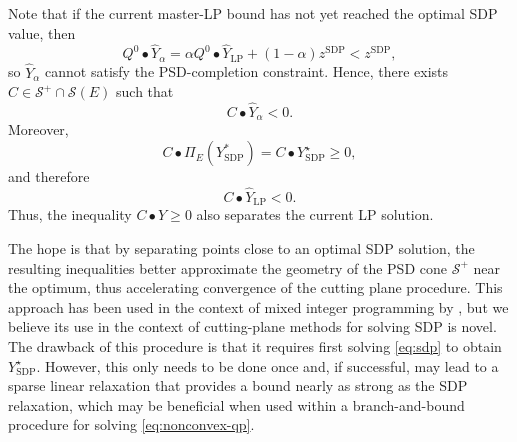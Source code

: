 \documentclass[twoside]{article}
\newcommand{\oo}[1]{{\textcolor{blue}{#1}}}
\newcommand{\ooc}[1]{{ \oo{[OG comment: #1}]}}
\newcommand{\matip}[2]{#1 \bullet #2}
\newcommand{\citet}[1]{\cite{#1}}
\begin{document}
		
		
		Note that if the current master-LP bound has not yet reached the optimal SDP value, then 
		\[ Q^0 \bullet \widehat Y_\alpha = \alpha Q^0\bullet\widehat Y_{\mathrm{LP}} + (1-\alpha)z^{\mathrm{SDP}} < z^{\mathrm{SDP}}, \]
		so $\widehat Y_\alpha$ cannot satisfy the PSD-completion constraint. Hence, there exists $C\in\mathcal S^+\cap\mathcal S(E)$ such that
		\[ C \bullet \widehat Y_\alpha < 0. \]
		Moreover,
		\[ C \bullet \Pi_E(Y^*_{\mathrm{SDP}}) = C \bullet Y_{\mathrm{SDP}}^\star \geq 0, \]
		and therefore
		\[ C \bullet \widehat Y_{\mathrm{LP}} < 0. \]
		Thus, the inequality $C\bullet Y\geq0$ also separates the current LP solution.
		
		
		
		The hope is that by separating points close to an optimal SDP solution, the resulting inequalities better approximate the geometry of the PSD cone $\mathcal{S}^+$ near the optimum, thus accelerating convergence of the cutting plane procedure.  This approach has been used in the context of mixed integer programming by \citet{fischetti2001polyhedral}, but we believe its use in the context of cutting-plane methods for solving SDP is novel. The drawback of this procedure is that it requires first solving \eqref{eq:sdp} to obtain $Y_{\mathrm{SDP}}^\star$. However, this only needs to be done once and, if successful, may lead to a sparse linear relaxation that provides a bound nearly as strong as the SDP relaxation, which may be beneficial when used within a branch-and-bound procedure for solving \eqref{eq:nonconvex-qp}.
		
\end{document}
